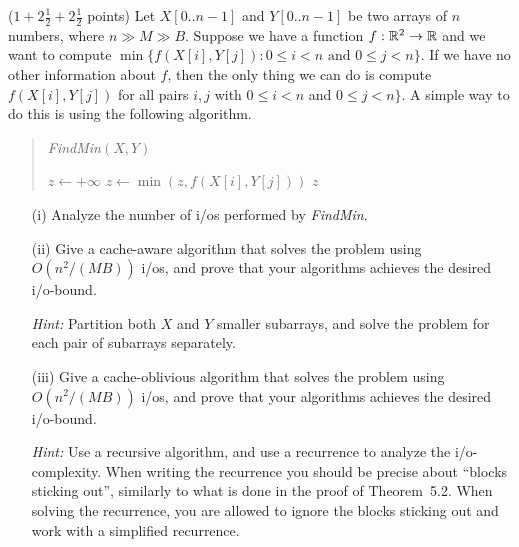 \documentclass{article}
\newcommand{\Reals}{{\Bbb R}}
\renewcommand{\leq}{\leqslant}
\newcommand{\io}{{\sc i/o}\xspace}
\newcommand{\ios}{{\io}s\xspace}
\newcounter{rcounter}
\newenvironment{rlist}%
{\begin{list}{\setnr-\arabic{rcounter}}{\usecounter{rcounter}}}{\end{list}}
\begin{document}
\begin{rlist}
    


\item ($1+2\frac{1}{2}+2\frac{1}{2}$ points)
    Let $X[0..n-1]$ and $Y[0..n-1]$ be two arrays of $n$ numbers, where $n \gg M \gg B$. Suppose we have a function $f:\Reals^2\rightarrow \Reals$ and we want to compute $\min \{ f(X[i],Y[j]) : 0\leq i <n \mbox{ and } 0\leq j <n \}$. If we have no other information about $f$, then the only thing we can do is compute $f(X[i],Y[j])$ for all pairs $i,j$ with $0\leq i <n$ and $0\leq j <n \}$. A simple way to do this is using the following algorithm.
    \begin{quotation}
    \noindent
    \emph{FindMin}$(X,Y)$ \\[-5mm]
    \begin{algorithmic}[1]
        \State $z \gets +\infty$
                \State $z \gets \min ( z, f(X[i],Y[j]) )$
           \EndFor
        \EndFor
        \State \Return $z$
    \end{algorithmic}
    \end{quotation}
    \begin{enumerate}
        \item[(i)]
            Analyze the number of \ios performed by \emph{FindMin}.
        \item[(ii)]
            Give a cache-aware algorithm that solves the problem using $O(n^2/(MB))$ \ios, and prove that your algorithms achieves the desired \io-bound.
            
            \emph{Hint:} Partition both $X$ and $Y$ smaller subarrays, and solve the problem for each pair of subarrays separately.
        \item[(iii)]
            Give a cache-oblivious algorithm that solves the problem using $O(n^2/(MB))$ \ios, and prove that your algorithms achieves the desired \io-bound.
            
            \emph{Hint:} Use a recursive algorithm, and use a recurrence to analyze the \io-complexity. When writing the recurrence you should be precise about ``blocks sticking out'', similarly to what is done in the proof of Theorem~5.2. When solving the recurrence, you are allowed to ignore the blocks sticking out and work with a simplified recurrence.
    \end{enumerate}
    

\end{rlist}
\end{document}
